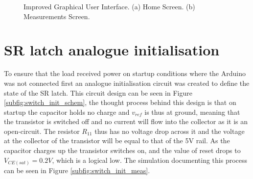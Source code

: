 \begin{figure}[ht]
\begin{subfigure}[]{0.45\textwidth}
		   \caption{ } \label{subfig:gui_meas}
     \end{subfigure}
     \caption[Improved Graphical User Interface.]{Improved Graphical User Interface. (a) Home Screen. (b) Measurements Screen.} \label{fig:gui_extra_results}
\end{figure}

\section{SR latch analogue initialisation} 
To ensure that the load received power on startup conditions where the Arduino was not connected first an analogue initialisation circuit was created to define the state of the SR latch. This circuit design can be seen in Figure \ref{subfig:switch_init_schem}, the thought process behind this design is that on startup the capacitor holds no charge and $v_{ref}$ is thus at ground, meaning that the transistor is switched off and no current will flow into the collector as it is an open-circuit. The resistor $R_{11}$ thus has no voltage drop across it and the voltage at the collector of the transistor will be equal to that of the 5V rail. As the capacitor charges up the transistor switches on, and the value of reset drops to $V_{CE(sat)}=0.2V$, which is a logical low. The simulation documenting this process can be seen in Figure \ref{subfig:switch_init_meas}.
